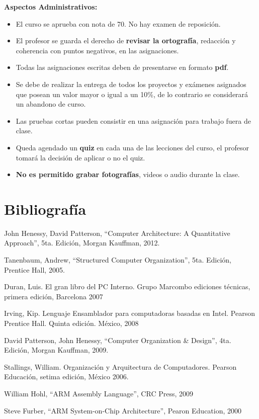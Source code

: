 \documentclass[11pt,fleqn]{report}
\providecommand{\tightlist}{%
	  \setlength{\itemsep}{0pt}\setlength{\parskip}{0pt}}
\begin{document}
\textbf{Aspectos Administrativos:}

\begin{itemize}
\tightlist
\item
  El curso se aprueba con nota de 70. No hay examen de reposición.
\item
  El profesor se guarda el derecho de \textbf{revisar la ortografía},
  redacción y coherencia con puntos negativos, en las asignaciones.
\item
  Todas las asignaciones escritas deben de presentarse en formato
  \textbf{pdf}.
\item
  Se debe de realizar la entrega de todos los proyectos y exámenes
  asignados que posean un valor mayor o igual a un 10\%, de lo contrario
  se considerará un abandono de curso.
\item
  Las pruebas cortas pueden consistir en una asignación para trabajo
  fuera de clase.
\item
  Queda agendado un \textbf{quiz} en cada una de las lecciones del
  curso, el profesor tomará la decisión de aplicar o no el quiz.
\item
  \textbf{No es permitido grabar fotografías}, videos o audio durante la
  clase.
\end{itemize}

\section{Bibliografía}\label{bibliografuxeda}

John Henessy, David Patterson, ``Computer Architecture: A Quantitative
Approach'', 5ta. Edición, Morgan Kauffman, 2012.

Tanenbaum, Andrew, ``Structured Computer Organization'', 5ta. Edición,
Prentice Hall, 2005.

Duran, Luis. El gran libro del PC Interno. Grupo Marcombo ediciones
técnicas, primera edición, Barcelona 2007

Irving, Kip. Lenguaje Ensamblador para computadoras basadas en Intel.
Pearson Prentice Hall. Quinta edición. México, 2008

David Patterson, John Henessy, ``Computer Organization \& Design'', 4ta.
Edición, Morgan Kauffman, 2009.

Stallings, William. Organización y Arquitectura de Computadores. Pearson
Educación, setima edición, México 2006.

William Hohl, ``ARM Assembly Language'', CRC Press, 2009

Steve Furber, ``ARM System-on-Chip Architecture'', Pearon Education,
2000
\end{document}
